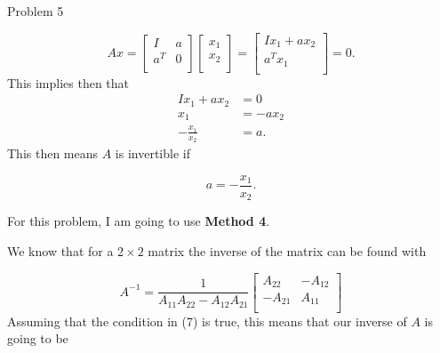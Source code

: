 \begin{problem}{Problem 5}
\begin{highlight}
        \begin{equation}
            Ax = 
            \begin{bmatrix}
                I & a \\
                a^{T} & 0 \\
            \end{bmatrix}
            \begin{bmatrix}
                x_{1} \\
                x_{2} \\
            \end{bmatrix}
            = 
            \begin{bmatrix}
                Ix_{1} + ax_{2} \\
                a^{T}x_{1} \\
            \end{bmatrix}
            = 0.
        \end{equation}
        This implies then that
        \begin{align}
            Ix_{1} + ax_{2} & = 0 \\
            x_{1} & = -ax_{2} \\
            -\frac{x_{1}}{x_{2}} & = a.
        \end{align}
        This then means $A$ is invertible if 
        
        \begin{equation}
            a = -\frac{x_{1}}{x_{2}}.
        \end{equation}
    \end{highlight}

    \begin{highlight}
        \noindent For this problem, I am going to use \textbf{Method 4}. \vspace*{1em}

        We know that for a $2 \times 2$ matrix the inverse of the matrix can be found with 

        \begin{equation}
            A^{-1} = \frac{1}{A_{11}A_{22} - A_{12}A_{21}}
            \begin{bmatrix}
                A_{22} & -A_{12} \\
                -A_{21} & A_{11} \\
            \end{bmatrix}
        \end{equation}
        Assuming that the condition in (7) is true, this means that our inverse of $A$ is going to be


\end{highlight}
\end{problem}
